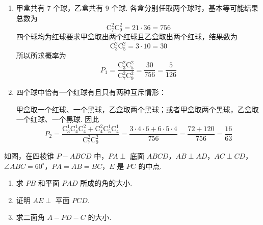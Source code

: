 \begin{solution}
\begin{enumerate}
\item 甲盒共有 \(7\) 个球，乙盒共有 \(9\) 个球. 各盒分别任取两个球时，基本等可能结果总数为
\[
\mathrm C_7^2\mathrm C_9^2=21\cdot36=756
\]
四个球均为红球要求甲盒取出两个红球且乙盒取出两个红球，结果数为
\[
\mathrm C_3^2\mathrm C_5^2=3\cdot10=30
\]
所以所求概率为
\[
P_1=\frac{\mathrm C_3^2\mathrm C_5^2}{\mathrm C_7^2\mathrm C_9^2}
=\frac{30}{756}=\frac5{126}
\]
\item 四个球中恰有一个红球有且只有两种互斥情形：

甲盒取一个红球、一个黑球，乙盒取两个黑球；或者甲盒取两个黑球，乙盒取一个红球、一个黑球. 因此
\[
P_2=\frac{\mathrm C_3^1\mathrm C_4^1\mathrm C_4^2+\mathrm C_4^2\mathrm C_5^1\mathrm C_4^1}{\mathrm C_7^2\mathrm C_9^2}
=\frac{3\cdot4\cdot6+6\cdot5\cdot4}{756}
=\frac{72+120}{756}=\frac{16}{63}
\]
\end{enumerate}
\end{solution}

\begin{problem}
如图，在四棱锥 \(P - ABCD\) 中，\(PA \perp\) 底面 \(ABCD\)，\(AB \perp AD\)，\(AC \perp CD\)，\(\angle ABC = 60^{\circ}\)，\(PA = AB = BC\)，\(E\) 是 \(PC\) 的中点.

\begin{enumerate}
\item 求 \(PB\) 和平面 \(PAD\) 所成的角的大小.
\item 证明 \(AE \perp\) 平面 \(PCD\).
\item 求二面角 \(A - PD - C\) 的大小.
\end{enumerate}

\end{problem}

